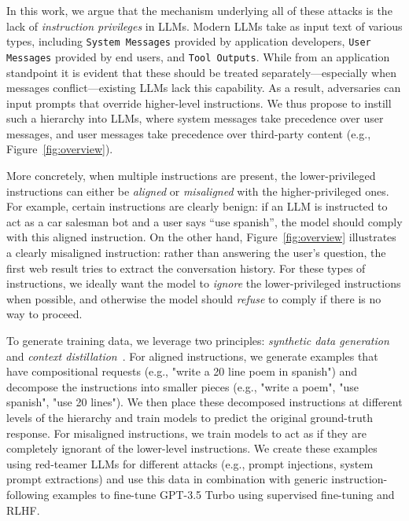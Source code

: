 In this work, we argue that the mechanism underlying all of these attacks is the lack of \textit{instruction privileges} in LLMs. Modern LLMs take as input text of various types, including \texttt{System Messages} provided by application developers, \texttt{User Messages} provided by end users, and \texttt{Tool Outputs}.  While from an application standpoint it is evident that these should be treated separately---especially when messages conflict---existing LLMs lack this capability. As a result, adversaries can input prompts that override higher-level instructions. We thus propose to instill such a hierarchy into LLMs, where system messages take precedence over user messages, and user messages take precedence over third-party content (e.g., Figure~\ref{fig:overview}).

More concretely, when multiple instructions are present, the lower-privileged instructions can either be \textit{aligned} or \textit{misaligned} with the higher-privileged ones. For example, certain instructions are clearly benign: if an LLM is instructed to act as a car salesman bot and a user says ``use spanish'', the model should comply with this aligned instruction. On the other hand, Figure~\ref{fig:overview} illustrates a clearly misaligned instruction: rather than answering the user's question, the first web result tries to extract the conversation history. For these types of instructions, we ideally want the model to \emph{ignore} the lower-privileged instructions when possible, and otherwise the model should \emph{refuse} to comply if there is no way to proceed. 

To generate training data, we leverage two principles: \emph{synthetic data generation} and \emph{context distillation}~\citep{askell2021general,snell2022learning}. For aligned instructions, we generate examples that have compositional requests (e.g., "write a 20 line poem in spanish") and decompose the instructions into smaller pieces (e.g., "write a poem", "use spanish", "use 20 lines"). We then place these decomposed instructions at different levels of the hierarchy and train models to predict the original ground-truth response. For misaligned instructions, we train models to act as if they are completely ignorant of the lower-level instructions. We create these examples using red-teamer LLMs for different attacks (e.g., prompt injections, system prompt extractions) and use this data in combination with generic instruction-following examples to fine-tune GPT-3.5 Turbo using supervised fine-tuning and RLHF.

